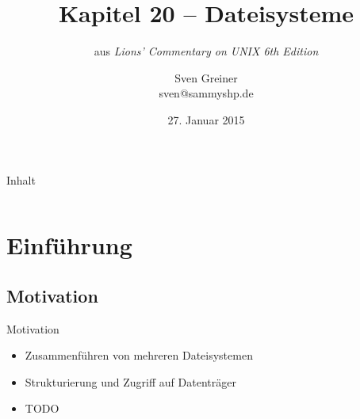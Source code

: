\documentclass{beamer}
\title{Kapitel 20 -- Dateisysteme}
\subtitle{aus \emph{Lions' Commentary on UNIX 6th Edition}}
\author{Sven Greiner\\\footnotesize\ttfamily sven@sammyshp.de}
\date{27. Januar 2015}
\begin{document}


\begin{frame}[plain]
    \titlepage
\end{frame}




\begin{frame}[plain]{Inhalt}
    \label{TableOfContents}
    \vfill
    \begin{columns}[t]
        \begin{column}{.5\textwidth}
            \tableofcontents[sections={1}]
        \end{column}
        \begin{column}{.5\textwidth}
            \tableofcontents[sections={2}]
        \end{column}
    \end{columns}
    \vfill
\end{frame}




\section{Einführung}

\begin{frame}[plain]
    \sectionpage
\end{frame}




\subsection{Motivation}

\begin{frame}{Motivation}
    \begin{itemize}
        \item Zusammenführen von mehreren Dateisystemen
        \item Strukturierung und Zugriff auf Datenträger
        \item TODO
    \end{itemize}
\end{frame}


\end{document}
